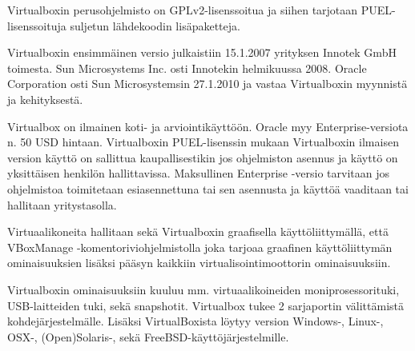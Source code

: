 Virtualboxin perusohjelmisto on GPLv2-lisenssoitua ja siihen tarjotaan  PUEL-lisenssoituja suljetun lähdekoodin lisäpaketteja. 

Virtualboxin ensimmäinen versio julkaistiin 15.1.2007 yrityksen Innotek GmbH toimesta. Sun Microsystems Inc. osti Innotekin helmikuussa 2008. Oracle Corporation osti Sun Microsystemsin 27.1.2010 ja vastaa Virtualboxin myynnistä ja kehityksestä. 


Virtualbox on ilmainen koti- ja arviointikäyttöön. Oracle myy Enterprise-versiota n. 50 USD hintaan. 
Virtualboxin PUEL-lisenssin mukaan Virtualboxin ilmaisen version käyttö on sallittua kaupallisestikin jos ohjelmiston asennus ja käyttö on yksittäisen henkilön hallittavissa. Maksullinen Enterprise -versio tarvitaan jos ohjelmistoa toimitetaan esiasennettuna tai sen asennusta ja käyttöä vaaditaan tai hallitaan yritystasolla.

Virtuaalikoneita hallitaan sekä Virtualboxin graafisella käyttöliittymällä, että VBoxManage -komentoriviohjelmistolla joka tarjoaa graafinen käyttöliittymän ominaisuuksien lisäksi pääsyn kaikkiin virtualisointimoottorin ominaisuuksiin.


Virtualboxin ominaisuuksiin kuuluu mm. virtuaalikoineiden moniprosessorituki, USB-laitteiden tuki, sekä snapshotit. Virtualbox tukee 2 sarjaportin välittämistä kohdejärjestelmälle. Lisäksi VirtualBoxista löytyy version Windows-, Linux-, OSX-, (Open)Solaris-, sekä FreeBSD-käyttöjärjestelmille.

